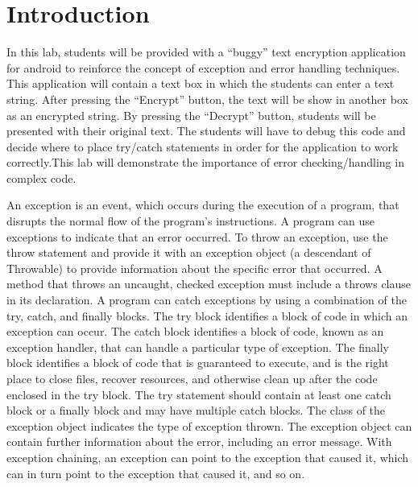 \section{Introduction}

In this lab, students will be provided with a “buggy” text encryption application for android to reinforce the concept of exception and error handling techniques. This application will contain a text box in which the students can enter a text string.  After pressing the “Encrypt” button, the text will be show in another box as an encrypted string. By pressing the “Decrypt” button, students will be presented with their original text. The students will have to debug this code and decide where to place try/catch statements in order for the application to work correctly.This lab will demonstrate the importance of error checking/handling in complex code.

An exception is an event, which occurs during the execution of a program, that disrupts the normal flow of the program's instructions. A program can use exceptions to indicate that an error occurred. To throw an exception, use the throw statement and provide it with an exception object (a descendant of Throwable) to provide information about the specific error that occurred. A method that throws an uncaught, checked exception must include a throws clause in its declaration. A program can catch exceptions by using a combination of the try, catch, and finally blocks. The try block identifies a block of code in which an exception can occur. The catch block identifies a block of code, known as an exception handler, that can handle a particular type of exception. The finally block identifies a block of code that is guaranteed to execute, and is the right place to close files, recover resources, and otherwise clean up after the code enclosed in the try block. The try statement should contain at least one catch block or a finally block and may have multiple catch blocks. The class of the exception object indicates the type of exception thrown. The exception object can contain further information about the error, including an error message. With exception chaining, an exception can point to the exception that caused it, which can in turn point to the exception that caused it, and so on.
